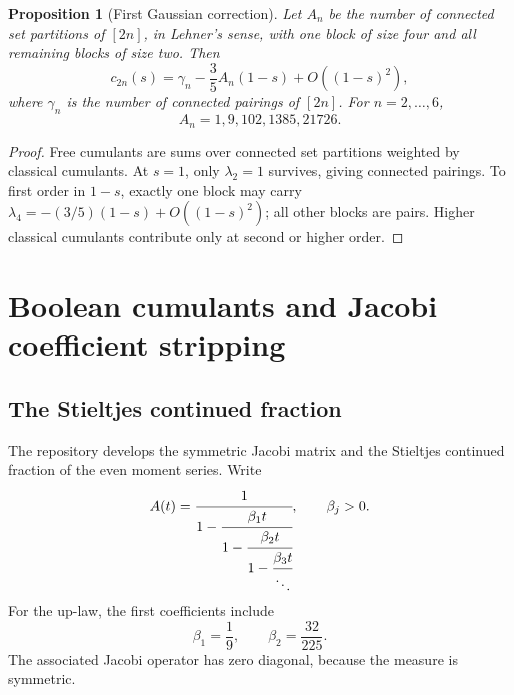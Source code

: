 \documentclass[11pt,oneside]{article}
\newtheorem{proposition}[theorem]{Proposition}
\theoremstyle{definition}
\theoremstyle{remark}
\begin{document}
\begin{proposition}[First Gaussian correction]\label{prop:connectedcorrection}
Let \(A_n\) be the number of connected set partitions of \([2n]\), in Lehner's sense, with one block of size four and all remaining blocks of size two. Then
\begin{equation}\label{eq:connectedcorrection}
c_{2n}(s)=\gamma_n-\frac35A_n(1-s)+O((1-s)^2),
\end{equation}
where \(\gamma_n\) is the number of connected pairings of \([2n]\). For \(n=2,\ldots,6\),
\[
A_n=1,9,102,1385,21726.
\]
\end{proposition}
\begin{proof}
Free cumulants are sums over connected set partitions weighted by classical cumulants. At \(s=1\), only \(\lambda_2=1\) survives, giving connected pairings. To first order in \(1-s\), exactly one block may carry \(\lambda_4=-(3/5)(1-s)+O((1-s)^2)\); all other blocks are pairs. Higher classical cumulants contribute only at second or higher order.
\end{proof}

\section{Boolean cumulants and Jacobi coefficient stripping}
\subsection{The Stieltjes continued fraction}
The repository develops the symmetric Jacobi matrix and the Stieltjes continued fraction of the even moment series. Write
\begin{equation}\label{eq:Sfraction}
A(t)=
\cfrac{1}{1-\cfrac{\beta_1t}{1-\cfrac{\beta_2t}{1-\cfrac{\beta_3t}{\ddots}}}},
\qquad \beta_j>0.
\end{equation}
For the up-law, the first coefficients include
\begin{equation}\label{eq:firstbetas}
\beta_1=\frac19,
\qquad
\beta_2=\frac{32}{225}.
\end{equation}
The associated Jacobi operator has zero diagonal, because the measure is symmetric.
\end{document}
